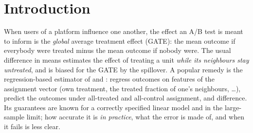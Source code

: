 \section{Introduction}
\label{sec:intro}
When users of a platform influence one another, the effect an A/B test is meant to inform is the \emph{global} average treatment effect (GATE):
the mean outcome if everybody were treated minus the mean outcome if nobody were. The usual difference in means estimates the effect of treating a unit
\emph{while its neighbours stay untreated}, and is biased for the GATE by the spillover. A popular remedy is the regression-based estimator of
\citet{chin2019} and \citet{hanugander2023}: regress outcomes on features of the assignment vector (own treatment, the treated fraction of one's neighbours, \dots),
predict the outcomes under all-treated and all-control assignment, and difference. Its guarantees are known for a correctly specified linear model
and in the large-sample limit; how accurate it is \emph{in practice}, what the error is made of, and when it fails is less clear.

